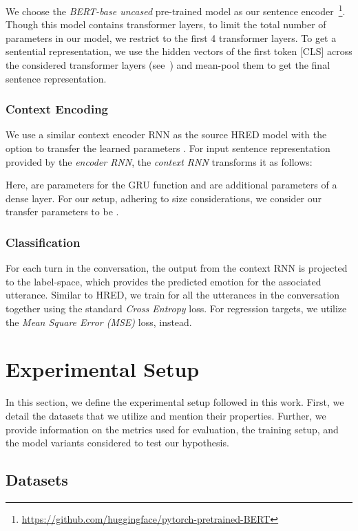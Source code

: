 \documentclass[preprint,3pt]{elsarticle}
\begin{document}
We choose the \textit{BERT-base uncased} pre-trained model as our sentence encoder~\footnote{\url{https://github.com/huggingface/pytorch-pretrained-BERT}}. Though this model contains  transformer layers, to limit the total number of parameters in our model, we restrict to the first 4 transformer layers. To get a sentential representation, we use the hidden vectors of the first token [CLS] across the considered transformer layers (see~\citet{devlin2018bert}) and mean-pool them to get the final sentence representation.

\subsubsection{Context Encoding} 
We use a similar context encoder RNN as the source HRED model with the option to transfer the learned parameters . For input sentence representation  provided by the \textit{encoder RNN}, the \textit{context RNN} transforms it as follows:
	
	Here,  are parameters for the GRU function and  are additional parameters of a dense layer. For our setup, adhering to size considerations, we consider our transfer parameters to be .

\subsubsection{Classification} 

For each turn in the conversation, the output from the context RNN is projected to the label-space, which provides the predicted emotion for the associated utterance. Similar to HRED, we train for all the utterances in the conversation together using the standard \textit{Cross Entropy} loss. For regression targets, we utilize the \textit{Mean Square Error (MSE)} loss, instead.


\section{Experimental Setup} \label{sec:experimental_setup}

In this section, we define the experimental setup followed in this work.
First, we detail the datasets that we utilize and mention their properties. Further, we provide information on the metrics used for evaluation, the training setup, and the model variants considered to test our hypothesis.

\subsection{Datasets}
\end{document}
